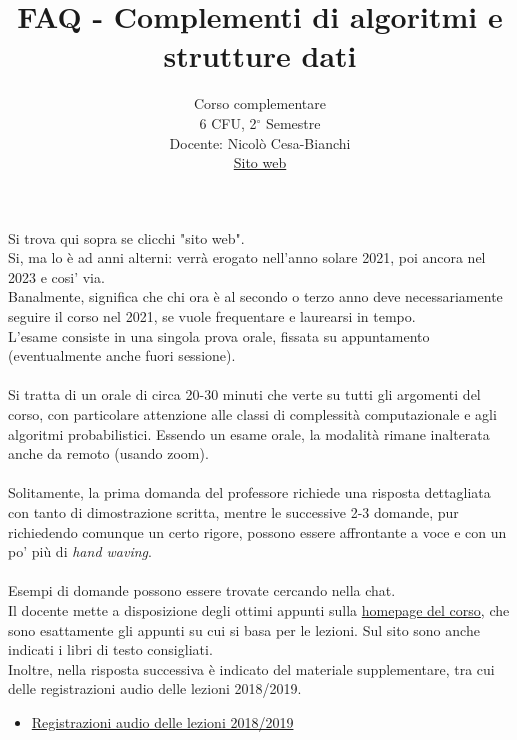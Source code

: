 \documentclass{article}
\title{FAQ - \textbf{Complementi di algoritmi e strutture dati}}
\author{
	Corso complementare \\6 CFU, 2$^{\circ}$ Semestre\\
	Docente: Nicolò Cesa-Bianchi \\ 
	\href{http://cesa-bianchi.di.unimi.it/Algo2/}{Sito web}
	\date{}
}
\begin{document}
 
\maketitle

\begin{enumerate}

\rmfamily
{} 
    Si trova qui sopra se clicchi "sito web".
\\
	
    Si, ma lo è ad anni alterni: verrà erogato nell'anno solare 2021, poi ancora nel 2023 e cosi' via.\\
    Banalmente, significa che chi ora è al secondo o terzo anno deve necessariamente seguire il corso nel 2021, se vuole frequentare e laurearsi in tempo.
\\

    L'esame consiste in una singola prova orale, fissata su appuntamento (eventualmente anche fuori sessione).
    \\\\
    Si tratta di un orale di circa 20-30 minuti che verte su tutti gli argomenti del corso, con particolare attenzione alle classi di complessità computazionale e agli algoritmi probabilistici. Essendo un esame orale, la modalità rimane inalterata anche da remoto (usando zoom).
    \\\\
    Solitamente, la prima domanda del professore richiede una risposta dettagliata con tanto di dimostrazione scritta, mentre le successive 2-3 domande, pur richiedendo comunque un certo rigore, possono essere affrontante a voce e con un po' più di \textit{hand waving}.
    \\\\

Esempi di domande possono essere trovate cercando nella chat.
\\
    Il docente mette a disposizione degli ottimi appunti sulla \href{http://cesa-bianchi.di.unimi.it/Algo2/}{homepage del corso}, che sono esattamente gli appunti su cui si basa per le lezioni. Sul sito sono anche indicati i libri di testo consigliati.\\
    Inoltre, nella risposta successiva è indicato del materiale supplementare, tra cui delle registrazioni audio delle lezioni 2018/2019.
\\
\begin{itemize}
		\item \href{https://mega.nz/#F!4xd2gC7A!AEZhvQBEIl2ipcyHpFN-JA}{Registrazioni audio delle lezioni 2018/2019}
		

\end{itemize}
\end{enumerate}
\end{document}
